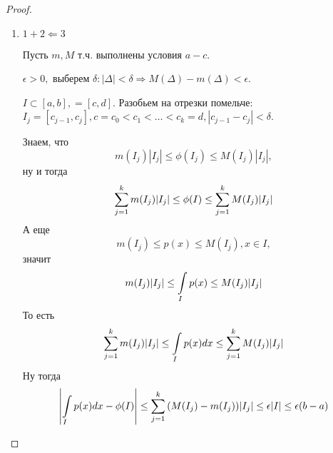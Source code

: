 \documentclass[12pt]{report}
\begin{document}
\begin{proof}
\begin{enumerate}
\item $1 + 2 \Leftarrow 3$

Пусть $m, M$ т.ч. выполнены условия $a - c$. 

$\epsilon > 0,$ выберем $\delta: |\Delta| < \delta \Rightarrow M(\Delta) - m(\Delta) < \epsilon$.

$I \subset [a, b], = [c, d]$. Разобьем на отрезки помельче: $I_j = [c_{j - 1}, c_j], c = c_0 < c_1 < \dots < c_k = d, |c_{j - 1} - c_j| < \delta$.

Знаем, что $$m(I_j)|I_j| \le \phi(I_j) \le M(I_j)|I_j|,$$ ну и тогда
$$\sum\limits_{j = 1}^k{m(I_j)|I_j|} \le \phi(I) \le \sum\limits_{j = 1}^k{M(I_j)|I_j|}$$
А еще $$m(I_j) \le p(x) \le M(I_j), x \in I,$$
значит $$m(I_j)|I_j| \le \int\limits_I{p(x)} \le M(I_j)|I_j|$$
То есть 
$$\sum\limits_{j = 1}^k{m(I_j)|I_j|} \le \int\limits_I{p(x)dx} \le \sum\limits_{j = 1}^k{M(I_j)|I_j|}$$
Ну тогда $$\left|\int\limits_I{p(x)dx} - \phi(I)\right| \le \sum\limits_{j = 1}^k{(M(I_j) - m(I_j))|I_j|} \le \epsilon |I| \le \epsilon (b - a)$$
\end{enumerate}
\end{proof}
\end{document}
